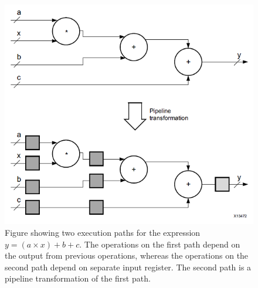 \documentclass[12pt]{report}
\begin{document}
\begin{figure}
    \centering
    \includegraphics[scale=0.7]{figures/structure_fpga_imp_compute_function.png}
    \caption{Figure showing two execution paths for the expression $y=(a \times x) +  b + c$. The operations on the first path depend on the output from previous operations, whereas the operations on the second path depend on separate input register. The second path is a pipeline transformation of the first path. \citep{XilFPGAIntro}}
    \label{fig:pipeline}
\end{figure}

\end{document}
